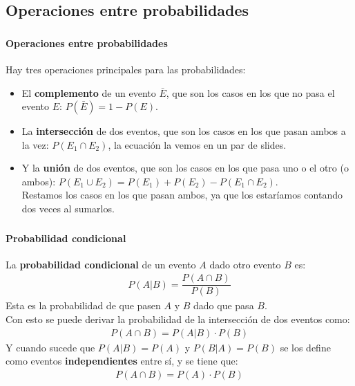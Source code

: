 \documentclass{beamer}
\begin{document}
\subsection{Operaciones entre probabilidades}

\begin{frame}
  \frametitle{\SECTIONA}
  \framesubtitle{Operaciones entre probabilidades}

  Hay tres operaciones principales para las probabilidades:
  \begin{itemize}
    \item<2-> El \textbf{complemento} de un evento \(\bar{E}\), que son los casos en los que no pasa el evento \(E\): \(P(\bar{E}) = 1 - P(E)\).
    \item<3-> La \textbf{intersección} de dos eventos, que son los casos en los que pasan ambos a la vez: \(P(E_{1} \cap E_{2})\), la ecuación la vemos en un par de slides.
    \item<4-> Y la \textbf{unión} de dos eventos, que son los casos en los que pasa uno o el otro (o ambos): \(P(E_{1} \cup E_{2}) = P(E_{1}) + P(E_{2}) - P(E_{1} \cap E_{2})\). \pause \\
      Restamos los casos en los que pasan ambos, ya que los estaríamos contando dos veces al sumarlos.
  \end{itemize}
\end{frame}

\begin{frame}
  \frametitle{\SECTIONA}
  \framesubtitle{Probabilidad condicional}

  La \textbf{probabilidad condicional} de un evento \(A\) dado otro evento \(B\) es:
  \begin{gather*}
    P(A | B) = \dfrac{P(A \cap B)}{P(B)}
  \end{gather*}
  Esta es la probabilidad de que pasen \(A\) y \(B\) dado que pasa \(B\). \pause \\
  Con esto se puede derivar la probabilidad de la intersección de dos eventos como:
  \begin{gather*}
    P(A \cap B) = P(A | B) \cdot P(B)
  \end{gather*} \pause
  Y cuando sucede que \(P(A|B) = P(A)\) y \(P(B|A) = P(B)\) se los define como eventos \textbf{independientes} entre sí, y se tiene que:
  \begin{gather*}
    P(A \cap B) = P(A) \cdot P(B)
  \end{gather*}
\end{frame}
\end{document}
